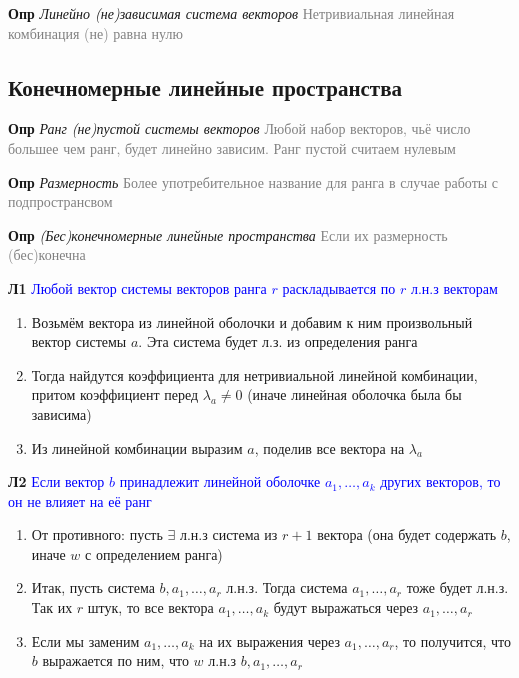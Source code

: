 \documentclass[a4paper, 14pt]{article}
\begin{document}
    \textbf{Опр} \textit{Линейно (не)зависимая система векторов}
    \textcolor{gray}{Нетривиальная линейная комбинация (не) равна нулю}

    \subsection{Конечномерные линейные пространства}

    \textbf{Опр} \textit{Ранг (не)пустой системы векторов}
    \textcolor{gray}{Любой набор векторов, чьё число большее чем ранг, будет линейно зависим. Ранг пустой считаем
    нулевым}

    \textbf{Опр} \textit{Размерность}
    \textcolor{gray}{Более употребительное название для ранга в случае работы с подпространсвом}

    \textbf{Опр} \textit{(Бес)конечномерные линейные пространства}
    \textcolor{gray}{Если их размерность (бес)конечна}

    \textbf{Л1} \textcolor{blue}{Любой вектор системы векторов ранга $r$ раскладывается по $r$ л.н.з векторам}

    \begin{enumerate}
        \item Возьмём вектора из линейной оболочки и добавим к ним произвольный вектор системы $a$.
        Эта система будет л.з. из определения ранга
        \item Тогда найдутся коэффициента для нетривиальной линейной комбинации, притом коэффициент перед
        $\lambda_a \neq 0$ (иначе линейная оболочка была бы зависима)
        \item Из линейной комбинации выразим $a$, поделив все вектора на $\lambda_a$
    \end{enumerate}

    \textbf{Л2} \textcolor{blue}{Если вектор $b$ принадлежит линейной оболочке $a_1, \dots, a_k$ других векторов, то
    он не влияет на её ранг}

    \begin{enumerate}
        \item От противного: пусть $\exists$ л.н.з система из $r+1$ вектора (она будет содержать $b$, иначе $w$ с
        определением ранга)
        \item Итак, пусть система $b, a_1, \dots, a_r$ л.н.з. Тогда система $a_1, \dots, a_r$ тоже будет л.н.з. Так
        их $r$ штук, то все вектора $a_1, \dots, a_k$ будут выражаться через $a_1, \dots, a_r$
        \item Если мы заменим $a_1, \dots, a_k$ на их выражения через $a_1, \dots, a_r$, то получится, что $b$
        выражается по ним, что $w$ л.н.з $b, a_1, \dots, a_r$
    \end{enumerate}
\end{document}
